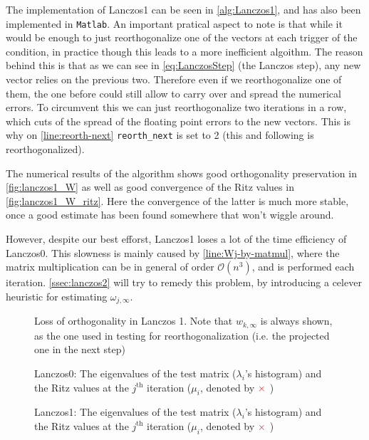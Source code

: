 \documentclass{article}
\begin{document}
	The implementation of Lanczos1 can be seen in \autoref{alg:Lanczos1}, and has also been implemented in \texttt{Matlab}. An important pratical aspect to note is that while it would be enough to just reorthogonalize one of the vectors at each trigger of the condition, in practice though this leads to a more inefficient algoithm. The reason behind this is that as we can see in \autoref{eq:LanczosStep} (the Lanczos step), any new vector relies on the previous two. Therefore even if we reorthogonalize one of them, the one before could still allow to carry over and spread the numerical errors. To circumvent this we can just reorthogonalize two iterations in a row, which cuts of the spread of the floating point errors to the new vectors. This is why on \autoref{line:reorth-next} \texttt{reorth\_next} is set to 2 (this and following is reorthogonalized). 
	
	The numerical results of the algorithm shows good orthogonality preservation in \autoref{fig:lanczos1_W} as well as good convergence of the Ritz values in \autoref{fig:lanczos1_W_ritz}. Here the convergence of the latter is much more stable, once a good estimate has been found somewhere that won't wiggle around. 
	
	However, despite our best efforst, Lanczos1 loses a lot of the time efficiency of Lanczos0. This slowness is mainly caused by \autoref{line:Wj-by-matmul}, where the matrix multiplication can be in general of order $\mathcal{O}(n^3)$, and is performed each iteration. \autoref{ssec:lanczos2} will try to remedy this problem, by introducing a celever heuristic for estimating $\omega_{j,\infty}$.
	\begin{figure}
		\centering
		\resizebox{\textwidth}{!}{
			}
		\caption{Loss of orthogonality in Lanczos 1. Note that $w_{k,\infty}$ is always shown, as the one used in testing for reorthogonalization (i.e. the projected one in the next step)}\label{fig:lanczos1_W}
	\end{figure}
	
	\begin{figure}
	\centering
	\caption{Lanczos0: The eigenvalues of the test matrix ($\lambda_i$'s histogram) and the Ritz values at the $j^{\mathrm{th}}$ iteration ($\mu_i$, denoted by ${\color{red} \times}$ )}\label{fig:lanczos0_W_ritz}
	\end{figure}
	
	\begin{figure}
	\centering
	\caption{Lanczos1: The eigenvalues of the test matrix ($\lambda_i$'s histogram) and the Ritz values at the $j^{\mathrm{th}}$ iteration ($\mu_i$, denoted by ${\color{red} \times}$ )}\label{fig:lanczos1_W_ritz}
	\end{figure}
	
\end{document}
